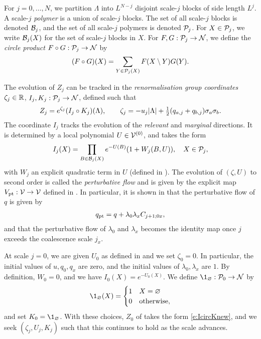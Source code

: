 For $j=0,\ldots, N$,
we partition $\Lambda$ into $L^{N-j}$ disjoint scale-$j$ blocks of side length $L^j$.
A scale-$j$ \emph{polymer} is a union of scale-$j$ blocks.
The set of all scale-$j$ blocks is denoted $\mathcal{B}_j$, and
the set of all scale-$j$ polymers is denoted $\mathcal{P}_j$.
For $X \in \mathcal{P}_j$, we write $\mathcal{B}_j(X)$ for the set of scale-$j$ blocks in $X$.
For $F, G : \mathcal{P}_j \rightarrow \mathcal{N}$, we define the \emph{circle product} $F \circ G : \mathcal{P}_j \rightarrow \mathcal{N}$ by
\begin{equation}
(F \circ G)(X) = \sum_{Y\in\mathcal{P}_j(X)} F(X \setminus Y) G(Y).
\end{equation}

The evolution of $Z_j$ can be tracked in the \emph{renormalisation group coordinates}
$\zeta_j \in {\mathbb R}$,
$I_j, K_j : \mathcal{P}_j \rightarrow \mathcal{N}$, defined such that
\begin{equation}
\label{e:IcircKnew}
    Z_j = e^{\zeta_j}(I_j\circ K_j)(\Lambda),
    \qquad
    \zeta_j= - u_j|\Lambda|
    + \textstyle{\frac 12} (q_{a,j} + q_{b,j}) \sigma_a\sigma_b
    .
\end{equation}
The coordinate $I_j$ tracks the evolution of the
\emph{relevant} and \emph{marginal} directions.  It
is determined by a local polynomial
$U\in \mathcal{V}^{(0)}$,
and takes the form
\begin{equation}
I_j(X) = \prod_{B \in \mathcal{B}_j(X)} e^{-U(B)} (1 + W_j(B, U)), \quad X \in \mathcal{P}_j,
\end{equation}
with $W_j$ an explicit quadratic term in $U$ (defined in \cite[\eqref{pt-e:WLTF}]{BBS-rg-pt}).
The evolution of $(\zeta, U)$ to second order is called the \emph{perturbative flow} and is
given by the explicit map $V_{\rm pt} : \mathcal{V} \rightarrow \mathcal{V}$ defined in
\cite[\eqref{pt-e:Vptdef}]{BBS-rg-pt}.
In particular, it is shown in \cite[Proposition~\ref{phi4-prop:pt}]{ST-phi4}
that the perturbative flow of $q$ is given by
\begin{align}
\label{e:qpt}
q_{\rm pt} = q + \lambda_0 \lambda_x C_{j+1;0x},
\end{align}
and that the perturbative flow of $\lambda_0$ and $\lambda_x$ becomes the identity map
once $j$ exceeds the coalescence scale $j_x$.


At scale $j = 0$, we are given $U_0$ as defined in %
\REF and we set $\zeta_0 = 0$.
In particular,
the initial values of $u,q_0,q_x$ are zero, and the initial values of $\lambda_0,\lambda_x$
are $1$.
By definition, $W_0 = 0$, and we have $I_0(X) = e^{-U_0(X)}$.
We define $\1_\varnothing : \Pcal_0 \to \Ncal$ by
\begin{equation}
\1_\varnothing(X) =
\begin{cases}
1 & X = \varnothing \\
0 & \text{otherwise},
\end{cases}
\end{equation}
and set $K_0 = \1_\varnothing$.
With these choices, $Z_0$ of \REF %
takes the form \eqref{e:IcircKnew}, and we seek $(\zeta_j, U_j, K_j)$ such that
this continues to hold as the scale advances.

